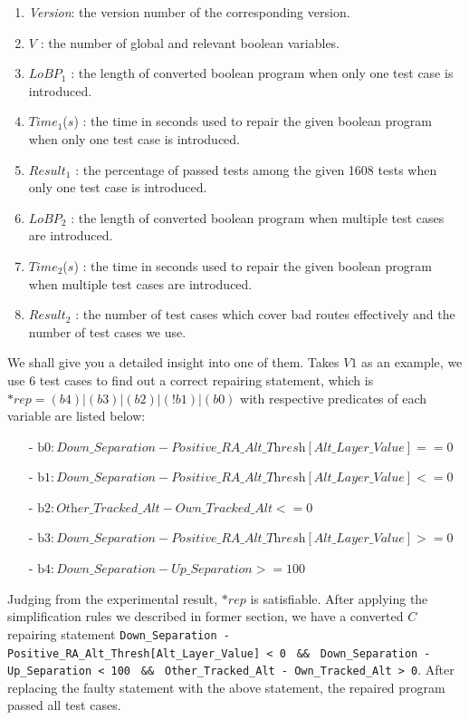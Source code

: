 \begin{enumerate}
\item {\it Version}: the version number of the corresponding version.
\item $V$             : the number of global and relevant boolean variables.
\item $LoBP_{1}$      : the length of converted boolean program when only one test case is introduced.
\item $Time_{1}$($s$) : the time in seconds used to repair the given boolean program when only one test case is introduced.
\item $Result_{1}$    : the percentage of passed tests among the given 1608 tests when only one test case is introduced.
\item $LoBP_{2}$      : the length of converted boolean program when multiple test cases are introduced.
\item $Time_{2}$($s$) : the time in seconds used to repair the given boolean program when multiple test cases are introduced.
\item $Result_{2}$    : the number of test cases which cover bad routes effectively and the number of test cases we use.
\end{enumerate}

We shall give you a detailed insight into one of them.
Takes $V1$ as an example, we use 6 test cases to find out a correct repairing statement, which is $*rep=(b4)|(b3)|(b2)|(!b1)|(b0)$ with respective predicates of each variable are listed below:

\begin{itemize}
\item[-] $\text{b0} : \textit{Down\_Separation} - \textit{Positive\_RA\_Alt\_Thresh}[\textit{Alt\_Layer\_Value}] == 0$
\item[-] $\text{b1} : \textit{Down\_Separation} - \textit{Positive\_RA\_Alt\_Thresh}[\textit{Alt\_Layer\_Value}] <= 0$
\item[-] $\text{b2} : \textit{Other\_Tracked\_Alt} - \textit{Own\_Tracked\_Alt} <= 0$
\item[-] $\text{b3} : \textit{Down\_Separation} - \textit{Positive\_RA\_Alt\_Thresh}[\textit{Alt\_Layer\_Value}] >= 0$
\item[-] $\text{b4} : \textit{Down\_Separation} - \textit{Up\_Separation} >= 100$
\end{itemize}

Judging from the experimental result, $*rep$ is satisfiable. After applying the simplification rules we described in former section,
we have a converted $C$ repairing statement \lstinline|Down_Separation - Positive_RA_Alt_Thresh[Alt_Layer_Value] < 0| \lstinline| && | \lstinline|Down_Separation - Up_Separation < 100| \lstinline| && | \lstinline|Other_Tracked_Alt - Own_Tracked_Alt > 0|.
After replacing the faulty statement with the above statement, the repaired program passed all test cases.

